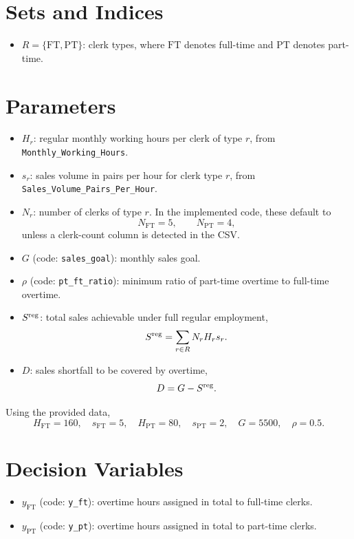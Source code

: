\section*{Sets and Indices}

\begin{itemize}
    \item $R=\{\mathrm{FT},\mathrm{PT}\}$: clerk types, where $\mathrm{FT}$ denotes full-time and $\mathrm{PT}$ denotes part-time.
\end{itemize}

\section*{Parameters}

\begin{itemize}
    \item $H_r$: regular monthly working hours per clerk of type $r$, from \texttt{Monthly\_Working\_Hours}.
    \item $s_r$: sales volume in pairs per hour for clerk type $r$, from \texttt{Sales\_Volume\_Pairs\_Per\_Hour}.
    \item $N_r$: number of clerks of type $r$. In the implemented code, these default to
    \[
    N_{\mathrm{FT}}=5,\qquad N_{\mathrm{PT}}=4,
    \]
    unless a clerk-count column is detected in the CSV.
    \item $G$ (code: \texttt{sales\_goal}): monthly sales goal.
    \item $\rho$ (code: \texttt{pt\_ft\_ratio}): minimum ratio of part-time overtime to full-time overtime.
    \item $S^{\textnormal{reg}}$: total sales achievable under full regular employment,
    \[
    S^{\textnormal{reg}}=\sum_{r\in R} N_r H_r s_r.
    \]
    \item $D$: sales shortfall to be covered by overtime,
    \[
    D=G-S^{\textnormal{reg}}.
    \]
\end{itemize}

Using the provided data,
\[
H_{\mathrm{FT}}=160,\quad s_{\mathrm{FT}}=5,\quad
H_{\mathrm{PT}}=80,\quad s_{\mathrm{PT}}=2,\quad
G=5500,\quad \rho=0.5.
\]

\section*{Decision Variables}

\begin{itemize}
    \item $y_{\mathrm{FT}}$ (code: \texttt{y\_ft}): overtime hours assigned in total to full-time clerks.
    \item $y_{\mathrm{PT}}$ (code: \texttt{y\_pt}): overtime hours assigned in total to part-time clerks.
\end{itemize}

